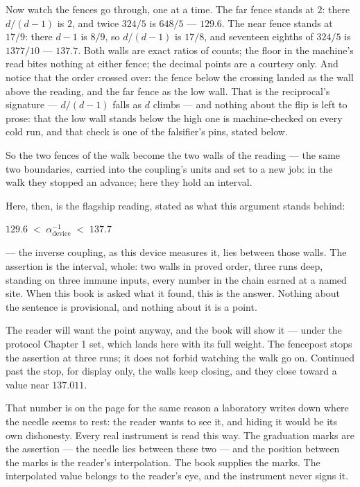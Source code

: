 Now watch the fences go through, one at a time. The far fence stands at $2$: there
$d/(d-1)$ is $2$, and twice $324/5$ is $648/5$ --- $129.6$. The near fence stands at
$17/9$: there $d-1$ is $8/9$, so $d/(d-1)$ is $17/8$, and seventeen eighths of
$324/5$ is $1377/10$ --- $137.7$. Both walls are exact ratios of counts; the floor
in the machine's read bites nothing at either fence; the decimal points are a
courtesy only. And notice that the order crossed over: the fence below the crossing
landed as the wall above the reading, and the far fence as the low wall. That is the
reciprocal's signature --- $d/(d-1)$ falls as $d$ climbs --- and nothing about the
flip is left to prose: that the low wall stands below the high one is
machine-checked on every cold run, and that check is one of the falsifier's pins,
stated below.

So the two fences of the walk become the two walls of the reading --- the same two
boundaries, carried into the coupling's units and set to a new job: in the walk they
stopped an advance; here they hold an interval.

Here, then, is the flagship reading, stated as what this argument stands behind:

\begin{center}
$129.6 \;<\; \alpha^{-1}_{\mathrm{device}} \;<\; 137.7$
\end{center}

--- the inverse coupling, as this device measures it, lies between those walls. The
assertion is the interval, whole: two walls in proved order, three runs deep,
standing on three immune inputs, every number in the chain earned at a named site.
When this book is asked what it found, this is the answer. Nothing about the
sentence is provisional, and nothing about it is a point.

The reader will want the point anyway, and the book will show it --- under the
protocol Chapter 1 set, which lands here with its full weight. The fencepost stops
the assertion at three runs; it does not forbid watching the walk go on. Continued
past the stop, for display only, the walls keep closing, and they close toward a
value near $137.011$.

That number is on the page for the same reason a laboratory writes down where the
needle seems to rest: the reader wants to see it, and hiding it would be its own
dishonesty. Every real instrument is read this way. The graduation marks are the
assertion --- the needle lies between these two --- and the position between the
marks is the reader's interpolation. The book supplies the marks. The interpolated
value belongs to the reader's eye, and the instrument never signs it.

